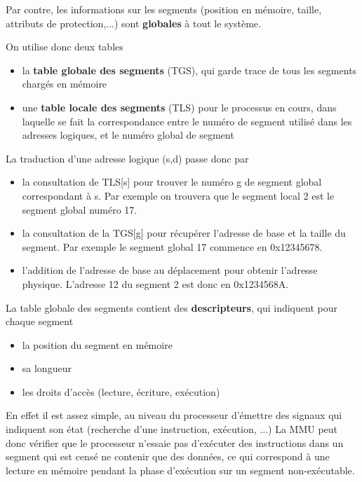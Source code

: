 \begin{multicols}{2}
Par contre, les informations sur les segments (position en mémoire,
taille, attributs de protection,...)  sont \textbf{globales} à tout le
système.

On utilise donc deux tables
\begin{itemize}
\item la \textbf{table globale des segments} (TGS), qui garde trace de
  tous les segments chargés en mémoire
\item une \textbf{table locale des segments} (TLS) pour le processus
  en cours, dans laquelle se fait la correspondance entre le numéro de
  segment utilisé dans les adresses logiques, et le numéro global de
  segment
\end{itemize}

La traduction d'une adresse logique (s,d) passe donc par
\begin{itemize}
\item la consultation de TLS[s] pour trouver le numéro g de segment
  global correspondant à s. Par exemple on trouvera que le segment
  local 2 est le segment global numéro 17.
\item la consultation de la TGS[g] pour récupérer l'adresse de base et
  la taille du segment. Par exemple le segment global 17 commence en
  0x12345678.
\item l'addition de l'adresse de base au déplacement pour obtenir
  l'adresse physique. L'adresse 12 du segment 2 est donc en
  0x1234568A.
\end{itemize}


La table globale des segments contient des
\textbf{descripteurs}, qui indiquent pour chaque segment
\begin{itemize}
\item la position du segment en mémoire
\item sa longueur
\item les droits d'accès (lecture, écriture, exécution)
\end{itemize}

En effet il est assez simple, au niveau du processeur d'émettre des
signaux qui indiquent son état (recherche d'une instruction,
exécution, ...)  La MMU peut donc vérifier que le processeur n'essaie
pas d'exécuter des instructions dans un segment qui est censé ne
contenir que des données, ce qui correspond à une lecture en mémoire
pendant la phase d'exécution sur un segment non-exécutable.


\end{multicols}
